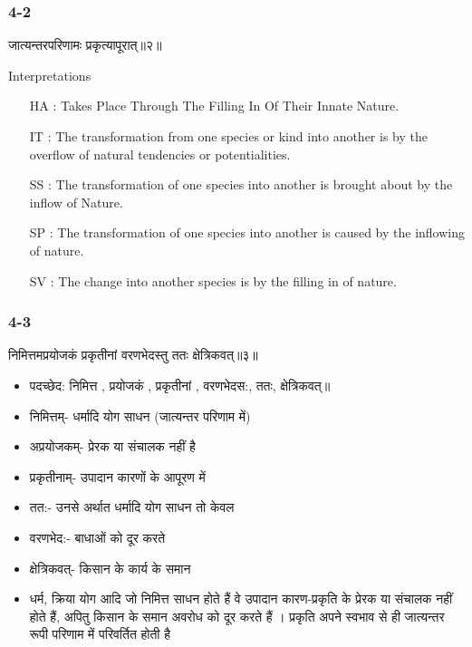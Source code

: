 \begin{frame}[fragile]\frametitle{4-2}
\begin{sanskrit}
जात्यन्तरपरिणामः प्रकृत्यापूरात्॥२॥
\end{sanskrit}

Interpretations
	\begin{itemize}	
	\item [HA]: Takes Place Through The Filling In Of Their Innate Nature.
	\item [IT]: The transformation from one species or kind into another is by the overflow of natural tendencies or potentialities.
	\item [SS]: The transformation of one species into another is brought about by the inflow of Nature.
	\item [SP]: The transformation of one species into another is caused by the inflowing of nature.
	\item [SV]: The change into another species is by the filling in of nature. 
	\end{itemize}
\end{frame}

\begin{frame}[fragile]\frametitle{4-3}
\begin{sanskrit}
निमित्तमप्रयोजकं प्रकृतीनां वरणभेदस्तु ततः क्षेत्रिकवत्॥३॥
\end{sanskrit}

	\begin{itemize}
	\item पदच्छेद:  निमित्त , प्रयोजकं‌ , प्रकृतीनां‌ , वरणभेदस:, ततः‌, क्षेत्रिकवत्‌॥
	\item निमित्तम्- धर्मादि योग साधन (जात्यन्तर परिणाम में)
	\item अप्रयोजकम्- प्रेरक या संचालक नहीं है
	\item प्रकृतीनाम्- उपादान कारणों के आपूरण में
	\item तत:- उनसे अर्थात धर्मादि योग साधन तो केवल
	\item वरणभेद:- बाधाओं को दूर करते
	\item क्षेत्रिकवत्- किसान के कार्य के समान
	\item धर्म, क्रिया योग आदि जो निमित्त साधन होते हैं वे उपादान कारण-प्रकृति के प्रेरक या संचालक नहीं होते हैं, अपितु किसान के समान अवरोध को दूर करते हैं । प्रकृति अपने स्वभाव से ही जात्यन्तर रूपी परिणाम में परिवर्तित होती है
	\end{itemize}
\end{frame}

